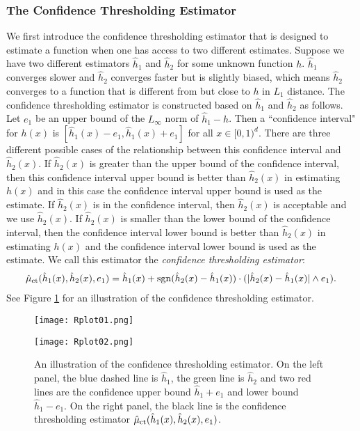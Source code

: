 \documentclass{article}
\begin{document}
 
\subsubsection{The Confidence Thresholding Estimator}
\label{section: ct}

We first introduce the confidence thresholding estimator that is designed to estimate a function when one has access to two different estimates. Suppose we have two different estimators $\hat h_1$ and $\hat h_2$ for some unknown function $h$. $\hat h_1$ converges slower and $\hat h_2$ converges faster but is slightly biased, which means $\hat h_2$ converges to a function that is different from but close to $h$ in $L_1$ distance. The confidence thresholding estimator is constructed based on $\hat h_1$ and $\hat h_2$ as follows. Let $e_1$ be an upper bound of the $L_\infty$ norm of $\hat h_1-h$. Then a ``confidence interval" for $h(x)$ is $[\hat h_1(x)-e_1,\hat h_1(x)+e_1]$ for all $x\in [0,1)^d$. There are three different possible cases of the relationship between this confidence interval and $\hat h_2(x)$. If $\hat h_2(x)$ is greater than the upper bound of the confidence interval, then this confidence interval upper bound is better than $\hat h_2(x)$ in estimating $h(x)$ and in this case the confidence interval upper bound is used as the estimate. If  $\hat h_2(x)$ is in the confidence interval, then $\hat h_2(x)$ is acceptable and we use $\hat h_2(x)$. If $\hat h_2(x)$ is smaller than the lower bound of the confidence interval, then the confidence interval lower bound is better than $\hat h_2(x)$ in estimating $h(x)$ and the  confidence interval lower bound is used as the estimate. We call this estimator the \emph{confidence thresholding estimator}:
\begin{align}\label{eqn: confidence thr}
    \hat \mu_{\rm ct}(\hat h_1(x),\hat h_2(x), e_1)=  \hat h_1(x) + {\rm sgn}(\hat h_2(x)-\hat h_1(x))\cdot (|\hat h_2(x)-\hat h_1(x)|\wedge e_1).
\end{align}
See Figure \ref{fig: confidence thresholding} for an illustration of the confidence thresholding estimator.
 
\begin{figure}[htbp]
    \centering
\begin{minipage}[t]{0.48\textwidth}
{\texttt{[image: Rplot01.png]}}
\end{minipage}
\begin{minipage}[t]{0.48\textwidth}
\texttt{[image: Rplot02.png]}
\end{minipage}
\caption{An illustration of the confidence thresholding estimator. On the left panel, the blue dashed line is $\hat h_1$, the green line is $\hat h_2$ and two red lines are the confidence upper bound $\hat h_1+e_1$ and lower bound $\hat h_1-e_1$. On the right panel, the black line is the confidence thresholding estimator $ \hat \mu_{\rm ct}(\hat h_1(x),\hat h_2(x), e_1)$. }
\label{fig: confidence thresholding}
\end{figure}
\end{document}
